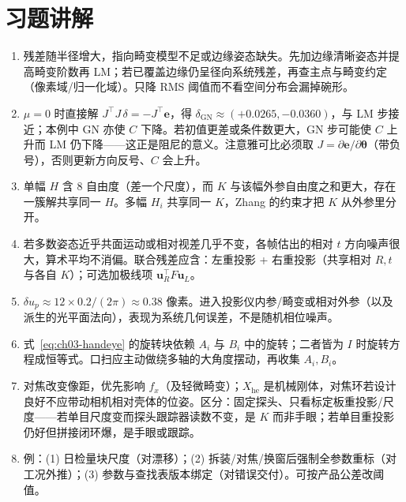 \section{习题讲解}

\begin{enumerate}
  \item 残差随半径增大，指向畸变模型不足或边缘姿态缺失。先加边缘清晰姿态并提高畸变阶数再 LM；若已覆盖边缘仍呈径向系统残差，再查主点与畸变约定（像素域/归一化域）。只降 RMS 阈值而不看空间分布会漏掉碗形。
  \item $\mu=0$ 时直接解 $J^\top J\,\delta=-J^\top\boldsymbol e$，得 $\delta_{\mathrm{GN}}\approx(+0.0265,-0.0360)$，与 LM 步接近；本例中 GN 亦使 $C$ 下降。若初值更差或条件数更大，GN 步可能使 $C$ 上升而 LM 仍下降——这正是阻尼的意义。注意雅可比必须取 $J=\partial\boldsymbol e/\partial\boldsymbol\theta$（带负号），否则更新方向反号、$C$ 会上升。
  \item 单幅 $H$ 含 $8$ 自由度（差一个尺度），而 $K$ 与该幅外参自由度之和更大，存在一簇解共享同一 $H$。多幅 $H_i$ 共享同一 $K$，Zhang 的约束才把 $K$ 从外参里分开。
  \item 若多数姿态近乎共面运动或相对视差几乎不变，各帧估出的相对 $t$ 方向噪声很大，算术平均不消偏。联合残差应含：左重投影 + 右重投影（共享相对 $R,t$ 与各自 $K$）；可选加极线项 $\boldsymbol u_R^\top F\boldsymbol u_L$。
  \item $\delta u_p\approx 12\times0.2/(2\pi)\approx0.38$ 像素。进入投影仪内参/畸变或相对外参（以及派生的光平面法向），表现为系统几何误差，不是随机相位噪声。
  \item 式~\eqref{eq:ch03-handeye} 的旋转块依赖 $A_i$ 与 $B_i$ 中的旋转；二者皆为 $I$ 时旋转方程成恒等式。口扫应主动做绕多轴的大角度摆动，再收集 $A_i,B_i$。
  \item 对焦改变像距，优先影响 $f_x$（及轻微畸变）；$X_{\mathrm{he}}$ 是机械刚体，对焦环若设计良好不应带动相机相对壳体的位姿。区分：固定探头、只看标定板重投影/尺度——若单目尺度变而探头跟踪器读数不变，是 $K$ 而非手眼；若单目重投影仍好但拼接闭环爆，是手眼或跟踪。
  \item 例：(1) 日检量块尺度（对漂移）；(2) 拆装/对焦/换窗后强制全参数重标（对工况外推）；(3) 参数与查找表版本绑定（对错误交付）。可按产品公差改阈值。
\end{enumerate}
